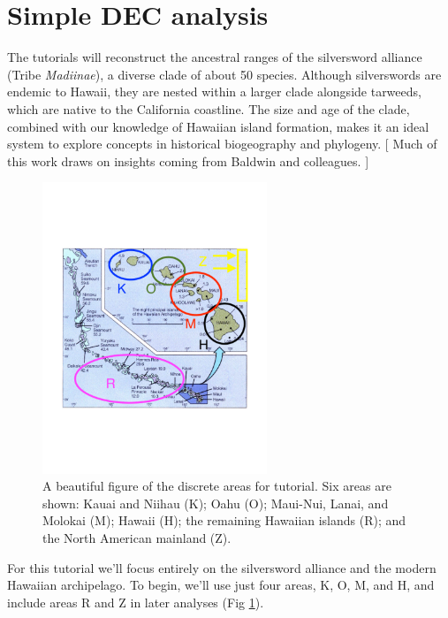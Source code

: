 

\section{Simple DEC analysis} \label{sec:bg_simple}


The tutorials will reconstruct the ancestral ranges of the silversword alliance (Tribe {\it Madiinae}), a diverse clade of about 50 species.
Although silverswords are endemic to Hawaii, they are nested within a larger clade alongside tarweeds, which are native to the California coastline.
The size and age of the clade, combined with our knowledge of Hawaiian island formation, makes it an ideal system to explore concepts in historical biogeography and phylogeny.
[ Much of this work draws on insights coming from Baldwin and colleagues. ]
 
\begin{figure}[!ht]
\centering
\includegraphics[width=0.6\textwidth]{figures/fig_hawaii_areas.pdf}
\caption{A beautiful figure of the discrete areas for tutorial. Six areas are shown: Kauai and Niihau (K); Oahu (O); Maui-Nui, Lanai, and Molokai (M); Hawaii (H); the remaining Hawaiian islands (R); and the North American mainland (Z).}
\label{fig:hawaii_areas}
\end{figure}
 
For this tutorial we'll focus entirely on the silversword alliance and the modern Hawaiian archipelago.
To begin, we'll use just four areas, K, O, M, and H, and include areas R and Z in later analyses (Fig \ref{fig:hawaii_areas}).

